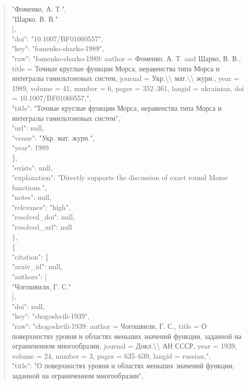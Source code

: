 \documentclass[11pt]{article}
\begin{document}
\begin{quote}
          "Фоменко, А. Т.",\\
          "Шарко, В. В."\\
        ],\\
        "doi": "10.1007/BF01060557",\\
        "key": "fomenko-sharko-1989",\\
        "raw": "fomenko-sharko-1989: author = Фоменко, А. Т. and Шарко, В. В., title = Точные круглые функции Морса, неравенства типа Морса и интегралы гамильтоновых систем, journal = Укр.\textbackslash{}\textbackslash{} мат.\textbackslash{}\textbackslash{} журн., year = 1989, volume = 41, number = 6, pages = 352--361, langid = ukrainian, doi = 10.1007/BF01060557,",\\
        "title": "Точные круглые функции Морса, неравенства типа Морса и интегралы гамильтоновых систем",\\
        "url": null,\\
        "venue": "Укр. мат. журн.",\\
        "year": 1989\\
      \},\\
      "exists": null,\\
      "explanation": "Directly supports the discussion of exact round Morse functions.",\\
      "notes": null,\\
      "relevance": "high",\\
      "resolved\_doi": null,\\
      "resolved\_url": null\\
    \},\\
    \{\\
      "citation": \{\\
        "arxiv\_id": null,\\
        "authors": [\\
          "Чогошвили, Г. С."\\
        ],\\
        "doi": null,\\
        "key": "chogoshvili-1939",\\
        "raw": "chogoshvili-1939: author = Чогошвили, Г. С., title = О поверхностях уровня и областях меньших значений функции, заданной на ограниченном многообразии, journal = Докл.\textbackslash{}\textbackslash{} АН СССР, year = 1939, volume = 24, number = 3, pages = 635--639, langid = russian,",\\
        "title": "О поверхностях уровня и областях меньших значений функции, заданной на ограниченном многообразии",\\

\end{quote}
\end{document}

